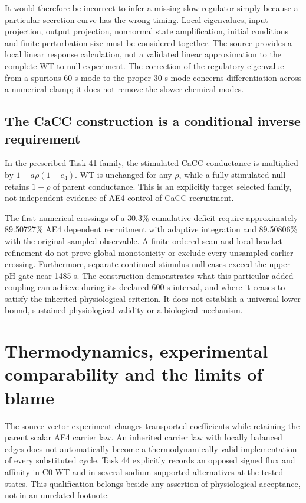 It would therefore be incorrect to infer a missing slow regulator simply because a particular secretion curve has the wrong timing. Local eigenvalues, input projection, output projection, nonnormal state amplification, initial conditions and finite perturbation size must be considered together. The source provides a local linear response calculation, not a validated linear approximation to the complete WT to null experiment. The correction of the regulatory eigenvalue from a spurious 60 s mode to the proper 30 s mode concerns differentiation across a numerical clamp; it does not remove the slower chemical modes.

\subsection{The CaCC construction is a conditional inverse requirement}
In the prescribed Task 41 family, the stimulated CaCC conductance is multiplied by $1-a\rho(1-e_4)$. WT is unchanged for any $\rho$, while a fully stimulated null retains $1-\rho$ of parent conductance. This is an explicitly target selected family, not independent evidence of AE4 control of CaCC recruitment.

The first numerical crossings of a 30.3\% cumulative deficit require approximately 89.50727\% AE4 dependent recruitment with adaptive integration and 89.50806\% with the original sampled observable. A finite ordered scan and local bracket refinement do not prove global monotonicity or exclude every unsampled earlier crossing. Furthermore, separate continued stimulus null cases exceed the upper pH gate near 1485 s. The construction demonstrates what this particular added coupling can achieve during its declared 600 s interval, and where it ceases to satisfy the inherited physiological criterion. It does not establish a universal lower bound, sustained physiological validity or a biological mechanism.

\section{Thermodynamics, experimental comparability and the limits of blame}
\label{sec:report-thermodynamics}
The source vector experiment changes transported coefficients while retaining the parent scalar AE4 carrier law. An inherited carrier law with locally balanced edges does not automatically become a thermodynamically valid implementation of every substituted cycle. Task 44 explicitly records an opposed signed flux and affinity in C0 WT and in several sodium supported alternatives at the tested states. This qualification belongs beside any assertion of physiological acceptance, not in an unrelated footnote.

